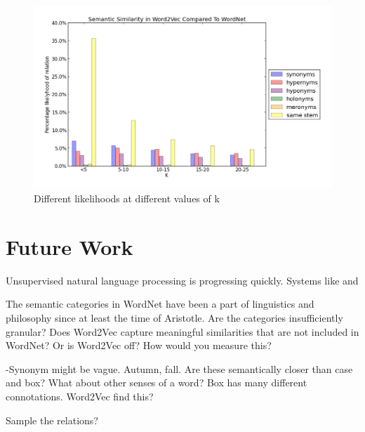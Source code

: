 \documentclass{article}
\begin{document}
\begin{figure}[!ht]
\centerline{\includegraphics[scale=.5]{Likelyhood.png}}
  \caption{Different likelihoods at different values of k}
  \label{fig:likelyhood}
\end{figure}


\section{Future Work} \label{Future Work}

Unsupervised natural language processing is progressing quickly. Systems like \cite{PATTY} and \cite{ReVerb2011}

The semantic categories in WordNet have been a part of linguistics and philosophy since at least the time of Aristotle. Are the categories insufficiently granular? Does Word2Vec capture meaningful similarities that are not included in WordNet? Or is Word2Vec off? How would you measure this? 

-Synonym might be vague. Autumn, fall. Are these semantically closer than case and box? What about other senses of a word?  Box has many different connotations. Word2Vec find this? 

Sample the relations?


\end{document}
